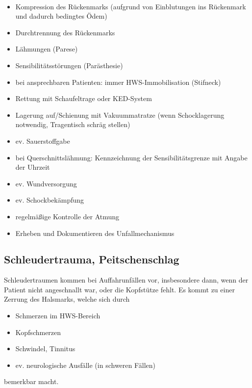 \paragraph{\TxGefahren}

\begin{itemize}
  \item Kompression des Rückenmarks (aufgrund von Einblutungen ins  Rückenmark 
  und dadurch bedingtes Ödem)
  \item Durchtrennung des Rückenmarks
  \item Lähmungen (Parese)
  \item Sensibilitätsstörungen (Parästhesie)
\end{itemize}






{   
\begin{itemize}
  \item bei ansprechbaren Patienten: immer HWS-Immobilisation (Stifneck)
  \item Rettung mit Schaufeltrage oder KED-System
  \item Lagerung auf/Schienung mit Vakuummatratze (wenn Schocklagerung
  notwendig,  Tragentisch schräg stellen)
  \item ev. Sauerstoffgabe
  \item bei Querschnittslähmung: Kennzeichnung der Sensibilitätsgrenze mit Angabe der Uhrzeit
  \item ev. Wundversorgung
  \item ev. Schockbekämpfung
  \item regelmäßige Kontrolle der Atmung
  \item Erheben und Dokumentieren des Unfallmechanismus
\end{itemize}
}

\subsection{Schleudertrauma, Peitschenschlag}

Schleudertraumen kommen bei Auffahrunfällen vor, insbesondere dann, wenn der
Patient  nicht angeschnallt war, oder die Kopfstütze fehlt. Es kommt zu einer
Zerrung  des Halsmarks, welche sich durch
\begin{itemize}
  \item Schmerzen im HWS-Bereich
  \item Kopfschmerzen
  \item Schwindel, Tinnitus
  \item ev. neurologische Ausfälle (in schweren Fällen)
\end{itemize}
bemerkbar macht.

